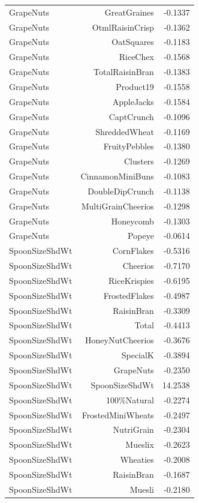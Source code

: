 \begin{longtable}{@{}lrr@{}}
GrapeNuts & GreatGraines & -0.1337 \\
GrapeNuts & OtmlRaisinCrisp & -0.1362 \\
GrapeNuts & OatSquares & -0.1183 \\
GrapeNuts & RiceChex & -0.1568 \\
GrapeNuts & TotalRaisinBran & -0.1383 \\
GrapeNuts & Product19 & -0.1558 \\
GrapeNuts & AppleJacks & -0.1584 \\
GrapeNuts & CaptCrunch & -0.1096 \\
GrapeNuts & ShreddedWheat & -0.1169 \\
GrapeNuts & FruityPebbles & -0.1380 \\
GrapeNuts & Clusters & -0.1269 \\
GrapeNuts & CinnamonMiniBuns & -0.1083 \\
GrapeNuts & DoubleDipCrunch & -0.1138 \\
GrapeNuts & MultiGrainCheerios & -0.1298 \\
GrapeNuts & Honeycomb & -0.1303 \\
GrapeNuts & Popeye & -0.0614 \\
SpoonSizeShdWt & CornFlakes & -0.5316 \\
SpoonSizeShdWt & Cheerios & -0.7170 \\
SpoonSizeShdWt & RiceKrispies & -0.6195 \\
SpoonSizeShdWt & FrostedFlakes & -0.4987 \\
SpoonSizeShdWt & RaisinBran & -0.3309 \\
SpoonSizeShdWt & Total & -0.4413 \\
SpoonSizeShdWt & HoneyNutCheerios & -0.3676 \\
SpoonSizeShdWt & SpecialK & -0.3894 \\
SpoonSizeShdWt & GrapeNuts & -0.2350 \\
SpoonSizeShdWt & SpoonSizeShdWt & 14.2538 \\
SpoonSizeShdWt & 100\%Natural & -0.2274 \\
SpoonSizeShdWt & FrostedMiniWheats & -0.2497 \\
SpoonSizeShdWt & NutriGrain & -0.2304 \\
SpoonSizeShdWt & Mueslix & -0.2623 \\
SpoonSizeShdWt & Wheaties & -0.2008 \\
SpoonSizeShdWt & RaisinBran & -0.1687 \\
SpoonSizeShdWt & Muesli & -0.2180 \\

\end{longtable}
